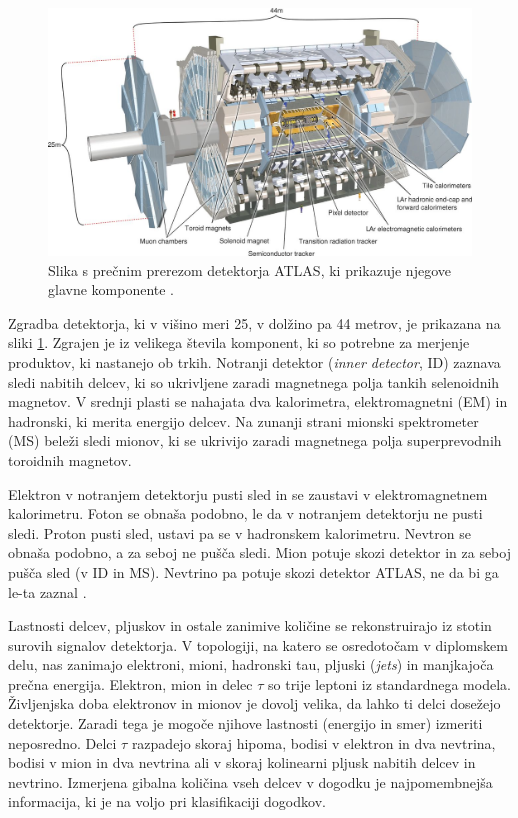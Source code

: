 \documentclass[11pt,a4paper,openany]{book}
\begin{document}
\begin{figure}[ht]
	\includegraphics[width=16.0cm]{physics/atlas_detector.jpg}
	
	\caption{Slika s prečnim prerezom detektorja ATLAS, ki prikazuje njegove glavne komponente \cite{AadScience2012}.  }
	\label{detektoratlas}
\end{figure}

Zgradba detektorja, ki v višino meri 25, v dolžino pa 44 metrov, je prikazana na sliki \ref{detektoratlas}. Zgrajen je iz velikega števila komponent, ki so potrebne za merjenje produktov, ki nastanejo ob trkih. Notranji detektor (\textit{inner detector}, ID) zaznava sledi nabitih delcev, ki so ukrivljene zaradi magnetnega polja tankih selenoidnih magnetov. V srednji plasti se nahajata dva kalorimetra, elektromagnetni (EM) in hadronski, ki merita energijo delcev. Na zunanji strani mionski spektrometer (MS) beleži sledi mionov, ki se ukrivijo zaradi magnetnega polja superprevodnih toroidnih magnetov.

Elektron v notranjem detektorju pusti sled in se zaustavi v elektromagnetnem kalorimetru. Foton se obnaša podobno, le da v notranjem detektorju ne pusti sledi. Proton pusti sled, ustavi pa se v hadronskem kalorimetru. Nevtron se obnaša podobno, a za seboj ne pušča sledi. Mion potuje skozi detektor in za seboj pušča sled (v ID in MS). Nevtrino pa potuje skozi detektor ATLAS, ne da bi ga le-ta zaznal \cite{CerknLHCParticles}.

Lastnosti delcev, pljuskov in ostale zanimive količine se rekonstruirajo iz stotin surovih signalov detektorja. V topologiji, na katero se osredotočam v diplomskem delu, nas zanimajo elektroni, mioni, hadronski tau, pljuski (\textit{jets}) in manjkajoča prečna energija. Elektron, mion in delec $\tau$ so trije leptoni iz standardnega modela. Življenjska doba elektronov in mionov je dovolj velika, da lahko ti delci dosežejo detektorje. Zaradi tega je mogoče njihove lastnosti (energijo in smer) izmeriti neposredno. Delci $\tau$ razpadejo skoraj hipoma, bodisi v elektron in dva nevtrina, bodisi v mion in dva nevtrina ali v skoraj kolinearni pljusk nabitih delcev in nevtrino. Izmerjena gibalna količina vseh delcev v dogodku je najpomembnejša informacija, ki je na voljo pri klasifikaciji dogodkov.
\end{document}
